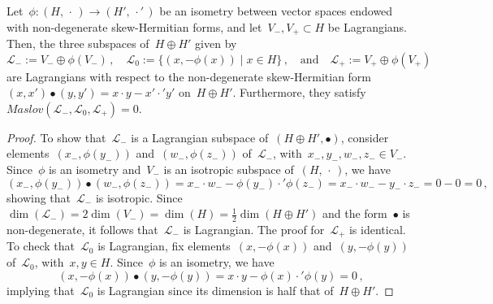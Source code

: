 \documentclass[10pt,a4paper]{amsart}
\begin{document}
	\begin{lem}
		\label{lem:alg}
		Let~$\phi\colon(H,\,\cdot\,)\to(H',\,\cdot'\,)$ be an isometry between vector spaces endowed with non-degenerate skew-Hermitian forms,
		and let~$V_-,V_+\subset H$ be Lagrangians. Then, the three subspaces of~$H\oplus H'$ given by
		\[
		\mathcal{L}_-:=V_-\oplus\phi(V_-)\,,\quad \mathcal{L}_0:=\{(x,-\phi(x))\mid x\in H\}\,,\quad\text{and}\quad \mathcal{L}_+:=V_+\oplus\phi(V_+)
		\]
		are Lagrangians with respect to the non-degenerate skew-Hermitian form~$(x,x')\bullet (y,y')=x\cdot y-x'\cdot'y'$ on~$H\oplus H'$.
		Furthermore, they satisfy~$\mathit{Maslov}(\mathcal{L}_-,\mathcal{L}_0,\mathcal{L}_+)=0$.
	\end{lem}

	\begin{proof}
		To show that~$\mathcal{L}_-$ is a Lagrangian subspace of~$(H\oplus H',\bullet)$, consider
		elements~$(x_-,\phi(y_-))$ and~$(w_-,\phi(z_-))$ of~$\mathcal{L}_-$, with~$x_-,y_-,w_-,z_-\in V_-$. Since~$\phi$ is
		an isometry and~$V_-$ is an isotropic subspace of~$(H,\,\cdot\,)$, we have
		\[
		(x_-,\phi(y_-))\bullet (w_-,\phi(z_-))=x_-\cdot w_--\phi(y_-)\cdot'\phi(z_-)=x_-\cdot w_--y_-\cdot z_-=0-0=0\,,
		\]
		showing that~$\mathcal{L}_-$ is isotropic. Since~$\dim(\mathcal{L}_-)=2\dim(V_-)=\dim(H)=\frac{1}{2}\dim(H\oplus H')$
		and the form~$\bullet$ is non-degenerate, it follows that~$\mathcal{L}_-$ is Lagrangian. The proof for~$\mathcal{L}_+$ is identical. To check that~$\mathcal{L}_0$ is Lagrangian, fix elements~$(x,-\phi(x))$ and~$(y,-\phi(y))$ of~$\mathcal{L}_0$, with~$x,y\in H$. Since~$\phi$ is an isometry, we have
		\[
		(x,-\phi(x))\bullet (y,-\phi(y))=x\cdot y-\phi(x)\cdot'\phi(y)=0\,,
		\]
		implying that~$\mathcal{L}_0$ is Lagrangian since its dimension is half that of~$H\oplus H'$.
		

\end{proof}
\end{document}
